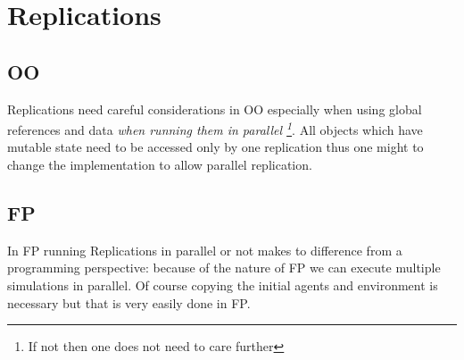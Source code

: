 \chapter{Replications}

\section{OO}
Replications need careful considerations in OO especially when using global references and data \textit{when running them in parallel \footnote{If not then one does not need to care further}}. All objects which have mutable state need to be accessed only by one replication thus one might to change the implementation to allow parallel replication.

\section{FP}
In FP running Replications in parallel or not makes to difference from a programming perspective: because of the nature of FP we can execute multiple simulations in parallel. Of course copying the initial agents and environment is necessary but that is very easily done in FP.